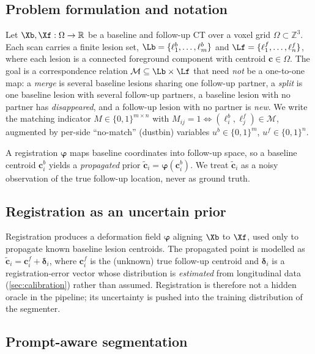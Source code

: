 \subsection{Problem formulation and notation}
\label{sec:formulation}
Let $\Xb,\Xf:\Omega\to\mathbb{R}$ be a baseline and follow-up CT over a voxel
grid $\Omega\subset\mathbb{Z}^3$. Each scan carries a finite lesion set,
$\Lb=\{\ell^b_1,\dots,\ell^b_{m}\}$ and $\Lf=\{\ell^f_1,\dots,\ell^f_{n}\}$,
where each lesion is a connected foreground component with centroid
$\bm{c}\in\Omega$. The goal is a correspondence relation
$\mathcal{M}\subseteq\Lb\times\Lf$ that need \emph{not} be a one-to-one map:
a \emph{merge} is several baseline lesions sharing one follow-up partner,
a \emph{split} is one baseline lesion with several follow-up partners,
a baseline lesion with no partner has \emph{disappeared}, and a follow-up lesion
with no partner is \emph{new}. We write the matching indicator
$M\in\{0,1\}^{m\times n}$ with $M_{ij}=1\Leftrightarrow(\ell^b_i,\ell^f_j)\in\mathcal{M}$,
augmented by per-side ``no-match'' (dustbin) variables
$u^b\in\{0,1\}^{m}$, $u^f\in\{0,1\}^{n}$.

A registration $\bm\varphi$ maps baseline coordinates into follow-up space, so a
baseline centroid $\bm{c}^b_i$ yields a \emph{propagated} prior
$\tilde{\bm{c}}_i=\bm\varphi(\bm{c}^b_i)$. We treat $\tilde{\bm{c}}_i$ as a noisy
observation of the true follow-up location, never as ground truth.

\subsection{Registration as an uncertain prior}
\label{sec:registration}
Registration produces a deformation field $\bm\varphi$ aligning $\Xb$ to $\Xf$,
used only to propagate known baseline lesion centroids. The propagated point is
modelled as $\tilde{\bm c}_i = \bm c^{f}_i + \bm\delta_i$, where $\bm c^{f}_i$ is
the (unknown) true follow-up centroid and $\bm\delta_i$ is a registration-error
vector whose distribution is \emph{estimated} from longitudinal data
(\cref{sec:calibration}) rather than assumed. Registration is therefore not a
hidden oracle in the pipeline; its uncertainty is pushed into the training
distribution of the segmenter. 

\subsection{Prompt-aware segmentation}
\label{sec:segmentation}
 
